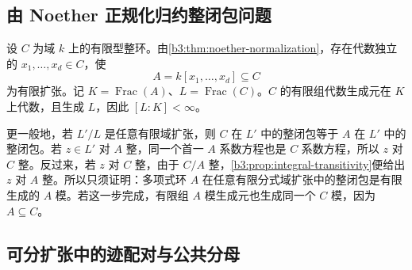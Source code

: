 \subsection{由 Noether 正规化归约整闭包问题}
\label{b3:subsec:0605:01}

设 \(C\) 为域 \(k\) 上的有限型整环。由\cref{b3:thm:noether-normalization}，存在代数独立的 \(x_1,\ldots,x_d\in C\)，使
\[
	A=k[x_1,\ldots,x_d]\subseteq C
\]
为有限扩张。记 \(K=\operatorname{Frac}(A)\)、\(L=\operatorname{Frac}(C)\)。\(C\) 的有限组代数生成元在 \(K\) 上代数，且生成 \(L\)，因此 \([L:K]<\infty\)。

\ProseParagraphBreak
更一般地，若 \(L'/L\) 是任意有限域扩张，则 \(C\) 在 \(L'\) 中的整闭包等于 \(A\) 在 \(L'\) 中的整闭包。若 \(z\in L'\) 对 \(A\) 整，同一个首一 \(A\) 系数方程也是 \(C\) 系数方程，所以 \(z\) 对 \(C\) 整。反过来，若 \(z\) 对 \(C\) 整，由于 \(C/A\) 整，\cref{b3:prop:integral-transitivity}便给出 \(z\) 对 \(A\) 整。所以只须证明：多项式环 \(A\) 在任意有限分式域扩张中的整闭包是有限生成的 \(A\) 模。若这一步完成，有限组 \(A\) 模生成元也生成同一个 \(C\) 模，因为 \(A\subseteq C\)。

\subsection{可分扩张中的迹配对与公共分母}
\label{b3:subsec:0605:02}

